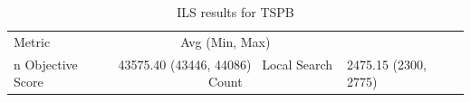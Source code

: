 \begin{table}[h!]
\centering
\begin{tabular}{lc}
\hline
Metric & Avg (Min, Max) \\n\hline
Objective Score & 43575.40 (43446, 44086) \
Local Search Count & 2475.15 (2300, 2775) \
\hline
\end{tabular}
\caption{ILS results for TSPB}
\label{tab:TSPB_ils_scores}
\end{table}
